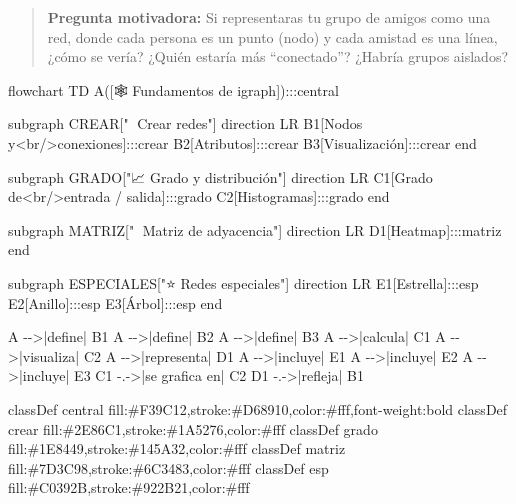 \documentclass[
  letterpaper,
  DIV=11,
  numbers=noendperiod]{scrreprt}
\newenvironment{Shaded}{\begin{snugshade}}{\end{snugshade}}
\newcommand{\NormalTok}[1]{\textcolor[rgb]{0.00,0.23,0.31}{#1}}
\begin{document}
\begin{quote}
\textbf{Pregunta motivadora:} Si representaras tu grupo de amigos como
una red, donde cada persona es un punto (nodo) y cada amistad es una
línea, ¿cómo se vería? ¿Quién estaría más ``conectado''? ¿Habría grupos
aislados?
\end{quote}

\begin{Shaded}
\begin{Highlighting}[]
\NormalTok{flowchart TD}
\NormalTok{    A([🕸️ Fundamentos de igraph]):::central}

\NormalTok{    subgraph CREAR["🔧 Crear redes"]}
\NormalTok{        direction LR}
\NormalTok{        B1[Nodos y\textless{}br/\textgreater{}conexiones]:::crear}
\NormalTok{        B2[Atributos]:::crear}
\NormalTok{        B3[Visualización]:::crear}
\NormalTok{    end}

\NormalTok{    subgraph GRADO["📈 Grado y distribución"]}
\NormalTok{        direction LR}
\NormalTok{        C1[Grado de\textless{}br/\textgreater{}entrada / salida]:::grado}
\NormalTok{        C2[Histogramas]:::grado}
\NormalTok{    end}

\NormalTok{    subgraph MATRIZ["🔢 Matriz de adyacencia"]}
\NormalTok{        direction LR}
\NormalTok{        D1[Heatmap]:::matriz}
\NormalTok{    end}

\NormalTok{    subgraph ESPECIALES["⭐ Redes especiales"]}
\NormalTok{        direction LR}
\NormalTok{        E1[Estrella]:::esp}
\NormalTok{        E2[Anillo]:::esp}
\NormalTok{        E3[Árbol]:::esp}
\NormalTok{    end}

\NormalTok{    A {-}{-}\textgreater{}|define| B1}
\NormalTok{    A {-}{-}\textgreater{}|define| B2}
\NormalTok{    A {-}{-}\textgreater{}|define| B3}
\NormalTok{    A {-}{-}\textgreater{}|calcula| C1}
\NormalTok{    A {-}{-}\textgreater{}|visualiza| C2}
\NormalTok{    A {-}{-}\textgreater{}|representa| D1}
\NormalTok{    A {-}{-}\textgreater{}|incluye| E1}
\NormalTok{    A {-}{-}\textgreater{}|incluye| E2}
\NormalTok{    A {-}{-}\textgreater{}|incluye| E3}
\NormalTok{    C1 {-}.{-}\textgreater{}|se grafica en| C2}
\NormalTok{    D1 {-}.{-}\textgreater{}|refleja| B1}

\NormalTok{    classDef central  fill:\#F39C12,stroke:\#D68910,color:\#fff,font{-}weight:bold}
\NormalTok{    classDef crear    fill:\#2E86C1,stroke:\#1A5276,color:\#fff}
\NormalTok{    classDef grado    fill:\#1E8449,stroke:\#145A32,color:\#fff}
\NormalTok{    classDef matriz   fill:\#7D3C98,stroke:\#6C3483,color:\#fff}
\NormalTok{    classDef esp      fill:\#C0392B,stroke:\#922B21,color:\#fff}
\end{Highlighting}
\end{Shaded}
\end{document}
